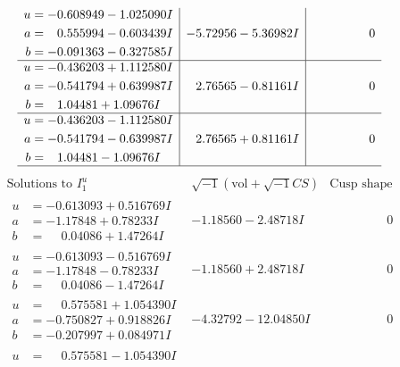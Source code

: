 \documentclass[1p]{elsarticle_modified}
\theoremstyle{definition}
\newcommand{\I}{\sqrt{-1}}
\begin{document}
$$\begin{array}{c|c|c}
\begin{aligned}
u &= -0.608949 - 1.025090 I \\
a &= \phantom{-}0.555994 - 0.603439 I \\
b &= -0.091363 - 0.327585 I\end{aligned}
 & -5.72956 - 5.36982 I & \phantom{-0.000000 } 0 \\ \hline\begin{aligned}
u &= -0.436203 + 1.112580 I \\
a &= -0.541794 + 0.639987 I \\
b &= \phantom{-}1.04481 + 1.09676 I\end{aligned}
 & \phantom{-}2.76565 - 0.81161 I & \phantom{-0.000000 } 0 \\ \hline\begin{aligned}
u &= -0.436203 - 1.112580 I \\
a &= -0.541794 - 0.639987 I \\
b &= \phantom{-}1.04481 - 1.09676 I\end{aligned}
 & \phantom{-}2.76565 + 0.81161 I & \phantom{-0.000000 } 0\\
 \hline 
 \end{array}$$\newpage$$\begin{array}{c|c|c}  
\text{Solutions to }I^u_{1}& \I (\text{vol} + \sqrt{-1}CS) & \text{Cusp shape}\\
 \hline 
\begin{aligned}
u &= -0.613093 + 0.516769 I \\
a &= -1.17848 + 0.78233 I \\
b &= \phantom{-}0.04086 + 1.47264 I\end{aligned}
 & -1.18560 - 2.48718 I & \phantom{-0.000000 } 0 \\ \hline\begin{aligned}
u &= -0.613093 - 0.516769 I \\
a &= -1.17848 - 0.78233 I \\
b &= \phantom{-}0.04086 - 1.47264 I\end{aligned}
 & -1.18560 + 2.48718 I & \phantom{-0.000000 } 0 \\ \hline\begin{aligned}
u &= \phantom{-}0.575581 + 1.054390 I \\
a &= -0.750827 + 0.918826 I \\
b &= -0.207997 + 0.084971 I\end{aligned}
 & -4.32792 - 12.04850 I & \phantom{-0.000000 } 0 \\ \hline\begin{aligned}
u &= \phantom{-}0.575581 - 1.054390 I \\

\end{aligned}
\end{array}$$
\end{document}
